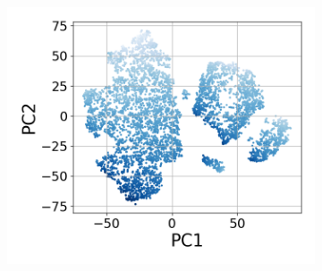 \documentclass{article} %
\begin{document}
\begin{figure}[t]
\begin{subfigure}{0.182\textwidth}
    \includegraphics[width=\linewidth]{images/tsne-components-entropy.png}
    \caption{}
\end{subfigure}\hfill
\begin{subfigure}{0.08\textwidth}
\end{subfigure}
\end{figure}
\end{document}
